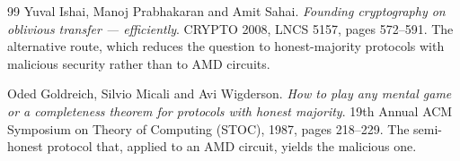\documentclass{aicr-conjecture}
\begin{document}
\begin{aicrbibliography}{99}
Yuval Ishai, Manoj Prabhakaran and Amit Sahai.
\emph{Founding cryptography on oblivious transfer --- efficiently}.
CRYPTO 2008, LNCS 5157, pages 572--591.
The alternative route, which reduces the question to honest-majority
protocols with malicious security rather than to AMD circuits.

Oded Goldreich, Silvio Micali and Avi Wigderson.
\emph{How to play any mental game or a completeness theorem for
protocols with honest majority}.
19th Annual ACM Symposium on Theory of Computing (STOC), 1987, pages
218--229.
The semi-honest protocol that, applied to an AMD circuit, yields the
malicious one.

\end{aicrbibliography}
\end{document}
